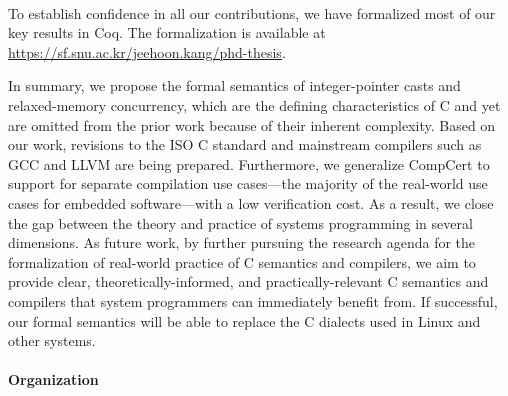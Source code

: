 \paragraph*{}

To establish confidence in all our contributions, we have formalized most of our key results in Coq.
The formalization is available at \url{https://sf.snu.ac.kr/jeehoon.kang/phd-thesis}.

In summary, we propose the formal semantics of integer-pointer casts and relaxed-memory concurrency,
which are the defining characteristics of C and yet are omitted from the prior work because of their
inherent complexity.  Based on our work, revisions to the ISO C standard and mainstream compilers
such as GCC and LLVM are being prepared.  Furthermore, we generalize CompCert to support for
separate compilation use cases---the majority of the real-world use cases for embedded
software---with a low verification cost.  As a result, we close the gap between the theory and
practice of systems programming in several dimensions.  As future work, by further pursuing the
research agenda for the formalization of real-world practice of C semantics and compilers, we aim to
provide clear, theoretically-informed, and practically-relevant C semantics and compilers that
system programmers can immediately benefit from.  If successful, our formal semantics will be able
to replace the C dialects used in Linux and other systems.



%


\paragraph{Organization}


